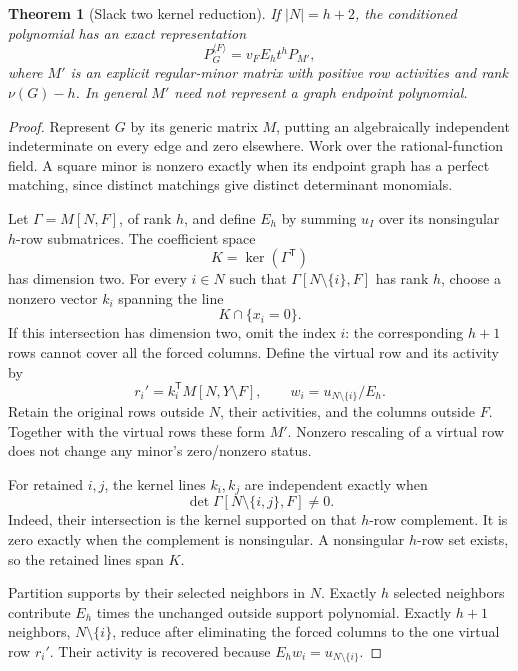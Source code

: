\documentclass[11pt,a4paper]{article}
\newtheorem{theorem}{Theorem}[section]
\theoremstyle{remark}\newtheorem{remark}[theorem]{Remark}
\begin{document}
\begin{theorem}[Slack two kernel reduction]\label{mrn:s:rb:thm:kernel}
If $|N|=h+2$, the conditioned polynomial has an exact representation
\begin{equation}\label{mrn:s:rb:eq:kernelidentity}
 P_G^{\langle F\rangle}=v_FE_ht^hP_{M'},
\end{equation}
where $M'$ is an explicit regular-minor matrix with positive row activities and rank $\nu(G)-h$. In general $M'$ need not represent a graph endpoint polynomial.
\end{theorem}
\begin{proof}
Represent $G$ by its generic matrix $M$, putting an algebraically independent indeterminate on every edge and zero elsewhere. Work over the rational-function field. A square minor is nonzero exactly when its endpoint graph has a perfect matching, since distinct matchings give distinct determinant monomials.

Let $\Gamma=M[N,F]$, of rank $h$, and define $E_h$ by summing $u_I$ over its nonsingular $h$-row submatrices. The coefficient space
\[
 K=\ker(\Gamma^{\mathsf T})
\]
has dimension two. For every $i\in N$ such that $\Gamma[N\setminus\{i\},F]$ has rank $h$, choose a nonzero vector $k_i$ spanning the line
\[
 K\cap\{x_i=0\}.
\]
If this intersection has dimension two, omit the index $i$: the corresponding $h+1$ rows cannot cover all the forced columns. Define the virtual row and its activity by
\begin{equation}\label{mrn:s:rb:eq:virtual}
 r_i'=k_i^{\mathsf T}M[N,Y\setminus F],\qquad
 w_i=u_{N\setminus\{i\}}/E_h.
\end{equation}
Retain the original rows outside $N$, their activities, and the columns outside $F$. Together with the virtual rows these form $M'$. Nonzero rescaling of a virtual row does not change any minor's zero/nonzero status.

For retained $i,j$, the kernel lines $k_i,k_j$ are independent exactly when
\begin{equation}\label{mrn:s:rb:eq:dualminor}
 \det\Gamma[N\setminus\{i,j\},F]\ne0.
\end{equation}
Indeed, their intersection is the kernel supported on that $h$-row complement. It is zero exactly when the complement is nonsingular. A nonsingular $h$-row set exists, so the retained lines span $K$.

Partition supports by their selected neighbors in $N$. Exactly $h$ selected neighbors contribute $E_h$ times the unchanged outside support polynomial. Exactly $h+1$ neighbors, $N\setminus\{i\}$, reduce after eliminating the forced columns to the one virtual row $r_i'$. Their activity is recovered because $E_hw_i=u_{N\setminus\{i\}}$.


\end{proof}
\end{document}
